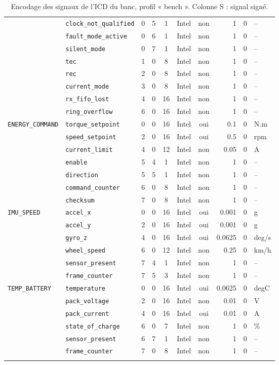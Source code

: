 \begin{longtable}{llrrcccrrl}
 & \texttt{clock\_not\_qualified} & 0 & 5 & 1 & Intel & non & 1 & 0 & -- \\
 & \texttt{fault\_mode\_active} & 0 & 6 & 1 & Intel & non & 1 & 0 & -- \\
 & \texttt{silent\_mode} & 0 & 7 & 1 & Intel & non & 1 & 0 & -- \\
 & \texttt{tec} & 1 & 0 & 8 & Intel & non & 1 & 0 & -- \\
 & \texttt{rec} & 2 & 0 & 8 & Intel & non & 1 & 0 & -- \\
 & \texttt{current\_mode} & 3 & 0 & 8 & Intel & non & 1 & 0 & -- \\
 & \texttt{rx\_fifo\_lost} & 4 & 0 & 16 & Intel & non & 1 & 0 & -- \\
 & \texttt{ring\_overflow} & 6 & 0 & 16 & Intel & non & 1 & 0 & -- \\
\addlinespace
\texttt{ENERGY\_COMMAND} & \texttt{torque\_setpoint} & 0 & 0 & 16 & Intel & oui & 0.1 & 0 & N.m \\
 & \texttt{speed\_setpoint} & 2 & 0 & 16 & Intel & oui & 0.5 & 0 & rpm \\
 & \texttt{current\_limit} & 4 & 0 & 12 & Intel & non & 0.05 & 0 & A \\
 & \texttt{enable} & 5 & 4 & 1 & Intel & non & 1 & 0 & -- \\
 & \texttt{direction} & 5 & 5 & 1 & Intel & non & 1 & 0 & -- \\
 & \texttt{command\_counter} & 6 & 0 & 8 & Intel & non & 1 & 0 & -- \\
 & \texttt{checksum} & 7 & 0 & 8 & Intel & non & 1 & 0 & -- \\
\addlinespace
\texttt{IMU\_SPEED} & \texttt{accel\_x} & 0 & 0 & 16 & Intel & oui & 0.001 & 0 & g \\
 & \texttt{accel\_y} & 2 & 0 & 16 & Intel & oui & 0.001 & 0 & g \\
 & \texttt{gyro\_z} & 4 & 0 & 16 & Intel & oui & 0.0625 & 0 & deg/s \\
 & \texttt{wheel\_speed} & 6 & 0 & 12 & Intel & non & 0.25 & 0 & km/h \\
 & \texttt{sensor\_present} & 7 & 4 & 1 & Intel & non & 1 & 0 & -- \\
 & \texttt{frame\_counter} & 7 & 5 & 3 & Intel & non & 1 & 0 & -- \\
\addlinespace
\texttt{TEMP\_BATTERY} & \texttt{temperature} & 0 & 0 & 16 & Intel & oui & 0.0625 & 0 & degC \\
 & \texttt{pack\_voltage} & 2 & 0 & 16 & Intel & non & 0.01 & 0 & V \\
 & \texttt{pack\_current} & 4 & 0 & 16 & Intel & oui & 0.01 & 0 & A \\
 & \texttt{state\_of\_charge} & 6 & 0 & 7 & Intel & non & 1 & 0 & \% \\
 & \texttt{sensor\_present} & 6 & 7 & 1 & Intel & non & 1 & 0 & -- \\
 & \texttt{frame\_counter} & 7 & 0 & 8 & Intel & non & 1 & 0 & -- \\
\addlinespace
\caption{Encodage des signaux de l'ICD du banc, profil « bench ». Colonne S : signal signé.}
\label{tab:icd-encodage}
\end{longtable}
